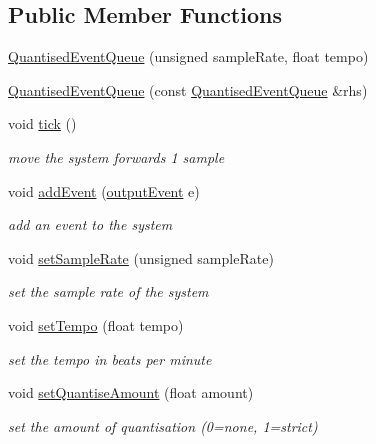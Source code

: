 \subsection*{Public Member Functions}
\begin{DoxyCompactItemize}
\item 
\mbox{\hyperlink{classQuantisedEventQueue_a98edbab612078a6b8662be1e02ec7d5d}{Quantised\+Event\+Queue}} (unsigned sample\+Rate, float tempo)
\item 
\mbox{\hyperlink{classQuantisedEventQueue_a531b0d61f7e3f2bb5891916f7ee2f981}{Quantised\+Event\+Queue}} (const \mbox{\hyperlink{classQuantisedEventQueue}{Quantised\+Event\+Queue}} \&rhs)
\item 
void \mbox{\hyperlink{classQuantisedEventQueue_a97055bead1291aef1d540640fcb61bf9}{tick}} ()
\begin{DoxyCompactList}\small\item\em move the system forwards 1 sample \end{DoxyCompactList}\item 
void \mbox{\hyperlink{classQuantisedEventQueue_a381591648286fab71836e6930d0f86d9}{add\+Event}} (\mbox{\hyperlink{structQuantisedEventQueue_1_1outputEvent}{output\+Event}} e)
\begin{DoxyCompactList}\small\item\em add an event to the system \end{DoxyCompactList}\item 
void \mbox{\hyperlink{classQuantisedEventQueue_a8a228847e9840052560ad27b7c48988d}{set\+Sample\+Rate}} (unsigned sample\+Rate)
\begin{DoxyCompactList}\small\item\em set the sample rate of the system \end{DoxyCompactList}\item 
void \mbox{\hyperlink{classQuantisedEventQueue_aa779e58dd906e9d2ddee9187296fca80}{set\+Tempo}} (float tempo)
\begin{DoxyCompactList}\small\item\em set the tempo in beats per minute \end{DoxyCompactList}\item 
void \mbox{\hyperlink{classQuantisedEventQueue_aa26d3254efa6178b559caf8978c46e17}{set\+Quantise\+Amount}} (float amount)
\begin{DoxyCompactList}\small\item\em set the amount of quantisation (0=none, 1=strict) \end{DoxyCompactList}\item 

\end{DoxyCompactItemize}
